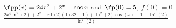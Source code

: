 {$\fpp(x) = 24x^2+2^x-\cos x$ and $\fp(0)= 5$, $f(0) = 0$
}
{$\frac{2 x^4 \ln ^2(2)+2^x+x \ln 2) (\ln 32-1)+\ln
   ^2(2) \cos (x)-1-\ln ^2(2)}{\ln ^2(2)}$
}

